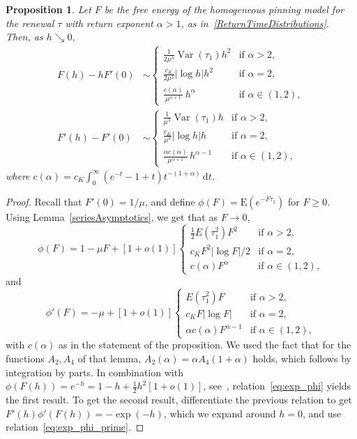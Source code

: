 \documentclass[11pt]{article}
\newtheorem{prop}[theo]{Proposition}
\theoremstyle{definition}
\numberwithin{equation}{section}
\numberwithin{figure}{section}
\numberwithin{table}{section}
\DeclareMathOperator{\var}{\ensuremath{\PEfont Var}}
\newcommand{\ga}{\alpha}
\newcommand{\dd}{\mathrm{d}}
\newcommand{\PEfont}{\mathrm}
\newcommand\bE{\ensuremath{\mathrm{E}}}
\begin{document}
\begin{prop}\label{pr:asympt.hom.free.energy}
Let $F$ be the free energy of the homogeneous pinning model for the renewal $\tau$ with return exponent $\ga > 1$, as in~\eqref{ReturnTimeDistributions}. Then, as $h \searrow 0$,
\begin{equation}\label{eq:asymptoticsFh}
\begin{aligned}
F(h) - h F'(0) &\sim
\begin{cases}
\frac{1}{2 \mu^3} \var(\tau_1) h^2 & \text{if } \ga > 2,\\
\frac{c_K}{2 \mu^3} |\log h| h^2 & \text{if } \ga = 2,\\
\frac{c(\ga)}{\mu^{\ga + 1}} \, h^{\ga} & \text{if } \ga \in (1,2),
\end{cases}\\
F'(h) - F'(0) &\sim
\begin{cases}
\frac{1}{\mu^3} \var(\tau_1) h & \text{if } \ga > 2,\\
\frac{c_K}{\mu^3} |\log h| h & \text{if } \ga = 2,\\
\frac{\ga c(\ga)}{\mu^{\ga + 1}} \, h^{\ga - 1} & \text{if } \ga \in(1,2),
\end{cases}
\end{aligned}
\end{equation}
where $c(\ga) = c_K \int_0^\infty (e^{- t} - 1 + t) t^{- (1 + \ga)} \, \dd t$.
\end{prop}

\begin{proof}
Recall that $F'(0) = 1/\mu$, and define $\phi(F) = \bE(e^{- F \tau_1})$ for $F\geq 0$. Using Lemma~\ref{seriesAsymptotics}, we get that as $F\to 0$,
\begin{equation}\label{eq:exp_phi}
\phi(F) = 1 - \mu F + [1 + o(1)]
\begin{cases}
\frac{1}{2} E(\tau_1^2) F^2 & \text{if } \ga > 2,\\
c_K F^2|\log F|/2 & \text{if } \ga =2,\\
c(\ga) F^\ga & \text{if } \ga \in (1,2),
\end{cases}
\end{equation}
and
\begin{equation}\label{eq:exp_phi_prime}
\phi'(F) = - \mu + [1 + o(1)]
\begin{cases}
E(\tau_1^2) F & \text{if } \ga > 2,\\
c_K F |\log F| & \text{if } \ga =2,\\
\ga c(\ga) F^{\ga-1} & \text{if } \ga \in (1,2),
\end{cases}
\end{equation}
with $c(\ga)$ as in the statement of the proposition. We used the fact that for the functions $A_2, A_4$ of that lemma, $A_2(\ga)=\ga A_4(1+\ga)$ holds, which follows by integration by parts. In combination with $\phi(F(h)) = e^{- h} = 1 - h + \frac{1}{2} h^2 [1 + o(1)]$, see~\cite[Section~2.1, Equation (2.2)]{Gi2007}, relation~\eqref{eq:exp_phi} yields the first result. To get the second result, differentiate the previous relation to get $F'(h) \phi' (F(h)) = - \exp(- h)$, which we expand around $h = 0$, and use relation~\eqref{eq:exp_phi_prime}.
\end{proof}
\end{document}
